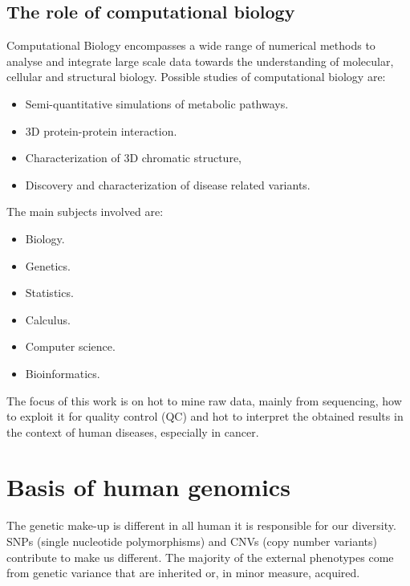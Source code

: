 	\subsection{The role of computational biology}
	Computational Biology encompasses a wide range of numerical methods to analyse and integrate large scale data towards the understanding of molecular, cellular and structural biology.
	Possible studies of computational biology are:

	\begin{multicols}{2}
		\begin{itemize}
			\item Semi-quantitative simulations of metabolic pathways.
			\item 3D protein-protein interaction.
			\item Characterization of 3D chromatic structure,
			\item Discovery and characterization of disease related variants.
		\end{itemize}
	\end{multicols}

	The main subjects involved are:

	\begin{multicols}{3}
		\begin{itemize}
			\item Biology.
			\item Genetics.
			\item Statistics.
			\item Calculus.
			\item Computer science.
			\item Bioinformatics.
		\end{itemize}
	\end{multicols}

	The focus of this work is on hot to mine raw data, mainly from sequencing, how to exploit it for quality control (QC) and hot to interpret the obtained results in the context of human diseases, especially in cancer.


\section{Basis of human genomics}
The genetic make-up is different in all human it is responsible for our diversity.
SNPs (single nucleotide polymorphisms) and CNVs (copy number variants) contribute to make us different.
The majority of the external phenotypes come from genetic variance that are inherited or, in minor measure, acquired.

